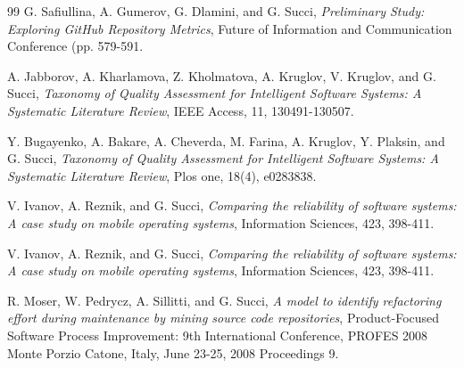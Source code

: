 \documentclass{styles/svproc}
\begin{document}
\begin{thebibliography}{99}
G. Safiullina, A. Gumerov, G. Dlamini, and G. Succi,
\textit{Preliminary Study: Exploring GitHub Repository Metrics},  
Future of Information and Communication Conference (pp. 579-591. 

A. Jabborov, A. Kharlamova, Z. Kholmatova, A. Kruglov, V. Kruglov, and G. Succi,  
\textit{Taxonomy of Quality Assessment for Intelligent Software Systems: A Systematic Literature Review},  
 IEEE Access, 11, 130491-130507.

Y. Bugayenko, A. Bakare, A. Cheverda, M. Farina, A. Kruglov, Y. Plaksin, and G. Succi,  
\textit{Taxonomy of Quality Assessment for Intelligent Software Systems: A Systematic Literature Review},  
Plos one, 18(4), e0283838.

V. Ivanov, A. Reznik, and G. Succi,  
\textit{Comparing the reliability of software systems: A case study on mobile operating systems},  
Information Sciences, 423, 398-411.

V. Ivanov, A. Reznik, and G. Succi,  
\textit{Comparing the reliability of software systems: A case study on mobile operating systems},  
Information Sciences, 423, 398-411.

R. Moser, W. Pedrycz, A. Sillitti, and G. Succi,  
\textit{A model to identify refactoring effort during maintenance by mining source code repositories},  
Product-Focused Software Process Improvement: 9th International Conference, PROFES 2008 Monte Porzio Catone, Italy, June 23-25, 2008 Proceedings 9.

\end{thebibliography}
\end{document}
